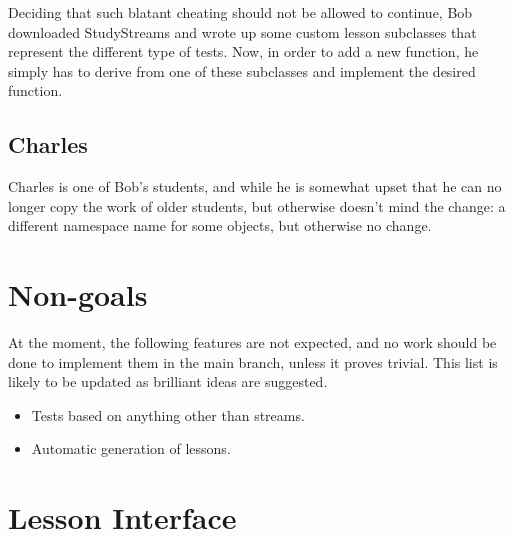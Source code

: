 \documentclass[12pt,a4paper]{report}
\begin{document}
			Deciding that such blatant cheating should not be allowed to continue,
			Bob downloaded StudyStreams and wrote up some custom lesson subclasses
			that represent the different type of tests.  Now, in order to add a new
			function, he simply has to derive from one of these subclasses and
			implement the desired function.

		\section{Charles}
			Charles is one of Bob's students, and while he is somewhat upset that
			he can no longer copy the work of older students, but otherwise doesn't
			mind the change:  a different namespace name for some objects, but
			otherwise no change.

	\chapter{Non-goals}
		At the moment, the following features are not expected, and no work
		should be done to implement them in the main branch, unless it proves
		trivial.  This list is likely to be updated as brilliant ideas are suggested.
		\begin{itemize}
			\item Tests based on anything other than streams.
			\item Automatic generation of lessons.
		\end{itemize}

	\chapter{Lesson Interface}
\end{document}
